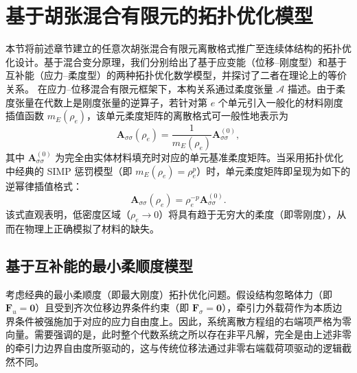 \section{基于胡张混合有限元的拓扑优化模型}
\label{sec:hz_top_opt_formulation}

本节将前述章节建立的任意次胡张混合有限元离散格式推广至连续体结构的拓扑优化设计。基于混合变分原理，我们分别给出了基于应变能（位移{--}刚度型）和基于互补能（应力{--}柔度型）的两种拓扑优化数学模型，并探讨了二者在理论上的等价关系。
在应力{--}位移混合有限元框架下，本构关系通过柔度张量 $\mathcal{A}$ 描述。由于柔度张量在代数上是刚度张量的逆算子，若针对第 $e$ 个单元引入一般化的材料刚度插值函数 $m_E(\rho_e)$，该单元柔度矩阵的离散格式可一般性地表示为
\[
\boldsymbol{A}_{\sigma\sigma}(\rho_e) = \frac{1}{m_E(\rho_e)} \boldsymbol{A}_{\sigma\sigma}^{(0)},
\]
其中 $\boldsymbol{A}_{\sigma\sigma}^{(0)}$ 为完全由实体材料填充时对应的单元基准柔度矩阵。当采用拓扑优化中经典的 SIMP 惩罚模型（即 $m_E(\rho_e) = \rho_e^p$）时，单元柔度矩阵即呈现为如下的逆幂律插值格式：
\[
\boldsymbol{A}_{\sigma\sigma}(\rho_e) = \rho_e^{-p} \boldsymbol{A}_{\sigma\sigma}^{(0)}.
\]
该式直观表明，低密度区域（$\rho_e \to 0$）将具有趋于无穷大的柔度（即零刚度），从而在物理上正确模拟了材料的缺失。


\subsection{基于互补能的最小柔顺度模型}
\label{subsec:hz_topopt_baseline_compliance}

考虑经典的最小柔顺度（即最大刚度）拓扑优化问题。假设结构忽略体力（即 $\boldsymbol{F}_u=\boldsymbol{0}$）且受到齐次位移边界条件约束（即 $\boldsymbol{F}_\sigma=\boldsymbol{0}$），牵引力外载荷作为本质边界条件被强施加于对应的应力自由度上。因此，系统离散方程组的右端项严格为零向量。需要强调的是，此时整个代数系统之所以存在非平凡解，完全是由上述非零的牵引力边界自由度所驱动的，这与传统位移法通过非零右端载荷项驱动的逻辑截然不同。

